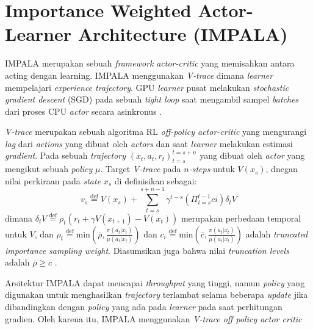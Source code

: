 \section{Importance Weighted Actor-Learner Architecture (IMPALA)}

IMPALA merupakan sebuah \emph{framework} \emph{actor-critic} yang memisahkan antara acting dengan learning.
IMPALA menggunakan \emph{V-trace} dimana \emph{learner} mempelajari \emph{experience trajectory}.
GPU \emph{learner} pusat melakukan \emph{stochastic gradient descent} (SGD) pada sebuah \emph{tight loop} saat mengambil sampel 
\emph{batches} dari proses CPU \emph{actor} secara asinkronus \citep{impala}.

\emph{V-trace} merupakan sebuah algoritma RL \emph{off-policy actor-critic} yang mengurangi \emph{lag} dari \emph{actions} yang dibuat oleh \emph{actors}
dan saat \emph{learner} melakukan estimasi \emph{gradient}. 
Pada sebuah \emph{trajectory} $(x_{t}, a_{t}, r_{t})^{t=s+n}_{t=s}$ yang dibuat oleh \emph{actor} yang mengikut sebuah \emph{policy} $\mu$.
Target \emph{V-trace} pada \emph{$n$-steps} untuk $V(x_{s})$, dnegan nilai perkiraan pada \emph{state} $x_{s}$ di definisikan sebagai:
\begin{equation}
  v_{s} \stackrel{\text{def}}{=} V(x_{s}) + \sum^{s+n-1}_{t=s} \gamma^{t-s} \left(\Pi^{t-1}_{i=s}ci\right) \delta_{t}V
\end{equation}
dimana $\delta_{t}V \stackrel{\text{def}}{=} \rho_{t}\left(r_{t} + \gamma V(x_{t+1}) - V(x_{t})\right)$ merupakan perbedaan temporal untuk $V$,
dan $\rho_{t} \stackrel{\text{def}}{=} \text{min}\left(\overline{\rho}, \frac{\pi (a_{t}|x_{t})}{\mu (a_{t}|x_{t})}\right)$ dan 
$c_{i} \stackrel{\text{def}}{=} \text{min}\left(\overline{c}, \frac{\pi (a_{t}|x_{t})}{\mu (a_{t}|x_{t})}\right)$ adalah \emph{truncated importance sampling weight}.
Diasumsikan juga bahwa nilai \emph{truncation levels} adalah $\overline{\rho} \geq \overline{c}$ \citep{impala}.

Arsitektur IMPALA dapat mencapai \emph{throughput} yang tinggi, namun \emph{policy} yang digunakan untuk menghasilkan \emph{trajectory} terlambat selama beberapa \emph{update} jika dibandingkan dengan \emph{policy} yang ada pada \emph{learner} pada saat perhitungan gradien.
Oleh karena itu, IMPALA menggunakan \emph{V-trace off policy actor critic}


